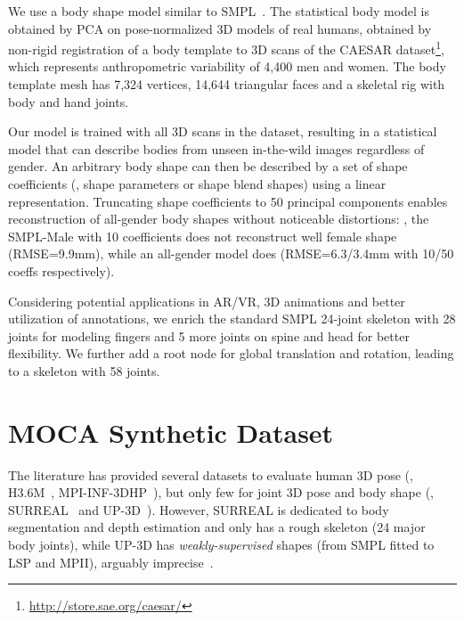 \documentclass[10pt,twocolumn,letterpaper]{article}
\newcommand{\beforesection}{\vspace{0mm}}
\newcommand{\aftersection}{\vspace{0mm}}
\begin{document}
We use a body shape model similar to SMPL~\cite{loper2015smpl,bogo2016keep}. The statistical body model is obtained by PCA on pose-normalized 3D models of real humans, obtained by non-rigid registration of a body template to 3D scans of the CAESAR dataset\footnote{\url{http://store.sae.org/caesar/}}, which represents anthropometric variability of 4,400 men and women.
The body template mesh has 7,324 vertices, 14,644 triangular faces and a skeletal rig with body and hand joints.

Our model is trained with all 3D scans in the dataset, resulting in a statistical model that can describe bodies from unseen in-the-wild images regardless of gender.
An arbitrary body shape can then be described by a set of shape coefficients (\ie, shape parameters or shape blend shapes) using a linear representation.
Truncating shape coefficients to 50 principal components enables reconstruction of all-gender body shapes without noticeable distortions:
\eg, the SMPL-Male with 10 coefficients does not reconstruct well female shape (RMSE=9.9mm), while an all-gender model does ({RMSE=6.3/3.4mm} with 10/50 coeffs respectively).

Considering potential applications in AR/VR, 3D animations and better utilization of annotations, we enrich the standard SMPL 24-joint skeleton with 28 joints for modeling fingers and 5 more joints on spine and head for better flexibility. We further add a root node for global translation and rotation, leading to a skeleton with 58 joints.

\beforesection
\section{MOCA Synthetic Dataset} \label{sec:dataset} 
\aftersection

The literature has provided several datasets to evaluate human 3D pose (\eg, H3.6M~\cite{ionescu2014human3}, MPI-INF-3DHP~\cite{Mehta3DV17}), but only few for joint 3D pose and body shape (\eg, SURREAL~\cite{varol2017learning} and UP-3D~\cite{lassner2017unite}).
However, SURREAL is dedicated to body segmentation and depth estimation and only has a rough skeleton (24 major body joints), while UP-3D has \emph{weakly-supervised} shapes (from SMPL fitted to LSP and MPII), arguably imprecise~\cite{varol18_bodynet}.
\end{document}
